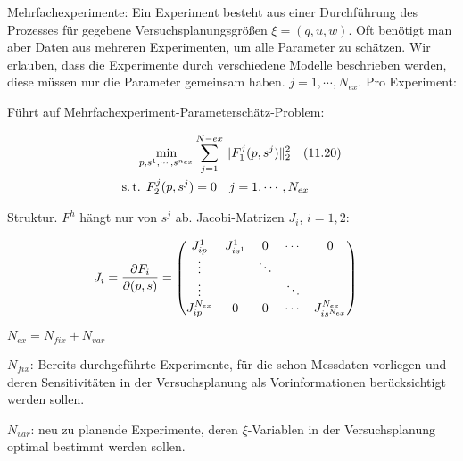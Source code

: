 \bitm
\item Mehrfachexperimente: Ein Experiment besteht aus einer Durchführung des Prozesses für gegebene Versuchsplanungsgrößen $\xi = (q,u,w)$. Oft benötigt man aber Daten aus mehreren Experimenten, um alle Parameter zu schätzen.
Wir erlauben, dass die Experimente durch verschiedene Modelle beschrieben werden, diese müssen nur die Parameter gemeinsam haben. $j=1,\cdots,N_{ex}$. Pro Experiment:
\bitm
\item
\eitm
\eitm

Führt auf Mehrfachexperiment-Parameterschätz-Problem:

\begin{align*}
\min_{p,s^1, \cdots, s^{n_{ex}}} &\sum\limits_{j=1}^{N-{ex}} \|F_1^j(p,s^j)\|_2^2 \quad (11.20) \\
\text{s.\,t. } F_2^j(p,s^j) &= 0 \quad j = 1,\cdots, N_{ex} \\
\end{align*}

Struktur. $F^h$ hängt nur von $s^j$ ab. Jacobi-Matrizen $J_i$, $i=1,2$:

\begin{align*}
J_i &= \frac{\partial F_i}{\partial (p,s)} = \begin{pmatrix} J_{ip}^1 & J_{is^1}^1 & 0 & \cdots & 0 \\ \vdots & & \ddots \\ \vdots &&& \ddots \\ J_{ip}^{N_{ex}} & 0 & 0 & \cdots & J_{is^{N_{ex}}}^{N_{ex}}  \end{pmatrix}
\end{align*}


$N_{ex} = N_{fix} + N_{var}$

\bitm
\item $N_{fix}$: Bereits durchgeführte Experimente, für die schon Messdaten vorliegen und deren Sensitivitäten in der Versuchsplanung als Vorinformationen berücksichtigt werden sollen.
\item $N_{var}$: neu zu planende Experimente, deren $\xi$-Variablen in der Versuchsplanung optimal bestimmt werden sollen.
\eitm

